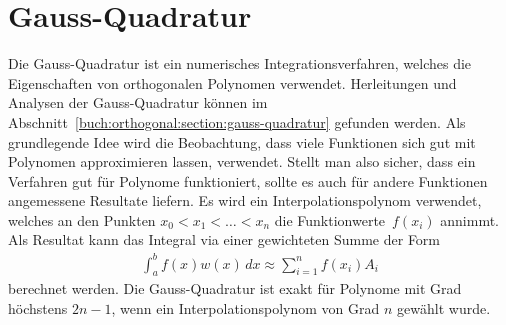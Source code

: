 %
%
%
\section{Gauss-Quadratur%
  \label{laguerre:section:quadratur}}
%
Die Gauss-Quadratur ist ein numerisches Integrationsverfahren,
%
welches die Eigenschaften von orthogonalen Polynomen verwendet.
Herleitungen und Analysen der Gauss-Quadratur können im
Abschnitt~\ref{buch:orthogonal:section:gauss-quadratur} gefunden werden.
Als grundlegende Idee wird die Beobachtung,
dass viele Funktionen sich gut mit Polynomen approximieren lassen,
verwendet.
Stellt man also sicher,
dass ein Verfahren gut für Polynome funktioniert,
sollte es auch für andere Funktionen angemessene Resultate liefern.
Es wird ein Interpolationspolynom verwendet,
welches an den Punkten $x_0 < x_1 < \ldots < x_n$
die Funktionwerte~$f(x_i)$ annimmt.
Als Resultat kann das Integral via einer gewichteten Summe der Form
\begin{align}
\int_a^b f(x) w(x) \, dx
\approx
\sum_{i=1}^n f(x_i) A_i
\label{laguerre:gaussquadratur}
\end{align}
berechnet werden.
Die Gauss-Quadratur ist exakt für Polynome mit Grad höchstens $2n -1$,
wenn ein Interpolationspolynom von Grad $n$ gewählt wurde.

